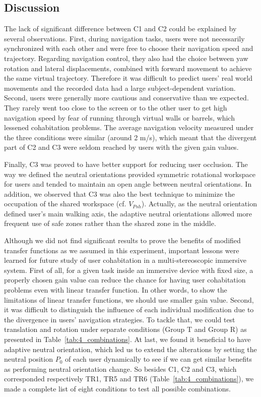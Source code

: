 \subsection{Discussion}
The lack of significant difference between C1 and C2 could be explained by several observations. First, during navigation tasks, users were not necessarily synchronized with each other and were free to choose their navigation speed and trajectory. Regarding navigation control, they also had the choice between yaw rotation and lateral displacements, combined with forward movement to achieve the same virtual trajectory. Therefore it was difficult to predict users' real world movements and the recorded data had a large subject-dependent variation. Second, users were generally more cautious and conservative than we expected. They rarely went too close to the screen or to the other user to get high navigation speed by fear of running through virtual walls or barrels, which lessened cohabitation problems. The average navigation velocity measured under the three conditions were similar (around 2 m/s), which meant that the divergent part of C2 and C3 were seldom reached by users with the given gain values.

Finally, C3 was proved to have better support for reducing user occlusion. The way we defined the neutral orientations provided symmetric rotational workspace for users and tended to maintain an open angle between neutral orientations. In addition, we observed that C3 was also the best technique to minimize the occupation of the shared workspace (cf. $V_{Psh}$). Actually, as the neutral orientation defined user's main walking axis, the adaptive neutral orientations allowed more frequent use of safe zones rather than the shared zone in the middle.

Although we did not find significant results to prove the benefits of modified transfer functions as we assumed in this experiment, important lessons were learned for future study of user cohabitation in a multi-stereoscopic immersive system. First of all, for a given task inside an immersive device with fixed size, a properly chosen gain value can reduce the chance for having user cohabitation problems even with linear transfer function. In other words, to show the limitations of linear transfer functions, we should use smaller gain value. Second, it was difficult to distinguish the influence of each individual modification due to the divergence in users' navigation strategies. To tackle that, we could test translation and rotation under separate conditions (Group T and Group R) as presented in Table~\ref{tab:4_combinations}. At last, we found it beneficial to have adaptive neutral orientation, which led us to extend the alterations by setting the neutral position $P_{0}$ of each user dynamically to see if we can get similar benefits as performing neutral orientation change. So besides C1, C2 and C3, which corresponded respectively TR1, TR5 and TR6 (Table~\ref{tab:4_combinations}), we made a complete list of eight conditions to test all possible combinations.

